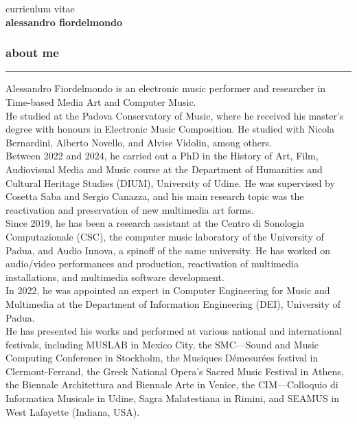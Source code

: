 \documentclass[7pt,a4paper]{article}
\begin{document}
curriculum vitae\\[2mm]
\Large\textbf{alessandro fiordelmondo}\\
\normalsize



\subsubsection*{about me}
\vspace{-0.5cm}
\rule{\textwidth}{0.4pt}
Alessandro Fiordelmondo is an electronic music performer and researcher in Time-based Media Art and Computer Music.\\
He studied at the Padova Conservatory of Music, where he received his master's degree with honours in Electronic Music Composition. He studied with Nicola Bernardini, Alberto Novello, and Alvise Vidolin, among others.\\
Between 2022 and 2024, he carried out a PhD in the History of Art, Film, Audiovisual Media and Music course at the Department of Humanities and Cultural Heritage Studies (DIUM), University of Udine. He was supervised by Cosetta Saba and Sergio Canazza, and his main research topic was the reactivation and preservation of new multimedia art forms.\\
Since 2019, he has been a research assistant at the Centro di Sonologia Computazionale (CSC), the computer music laboratory of the University of Padua, and Audio Innova, a spinoff of the same university. He has worked on audio/video performances and production, reactivation of multimedia installations, and multimedia software development.\\
In 2022, he was appointed an expert in Computer Engineering for Music and Multimedia at the Department of Information Engineering (DEI), University of Padua.\\
He has presented his works and performed at various national and international festivals, including MUSLAB in Mexico City, the SMC—Sound and Music Computing Conference in Stockholm, the Musiques Démesurées festival in Clermont-Ferrand, the Greek National Opera's Sacred Music Festival in Athens, the Biennale Architettura and Biennale Arte in Venice, the CIM—Colloquio di Informatica Musicale in Udine, Sagra Malatestiana in Rimini, and SEAMUS in West Lafayette (Indiana, USA).\\

\end{document}
